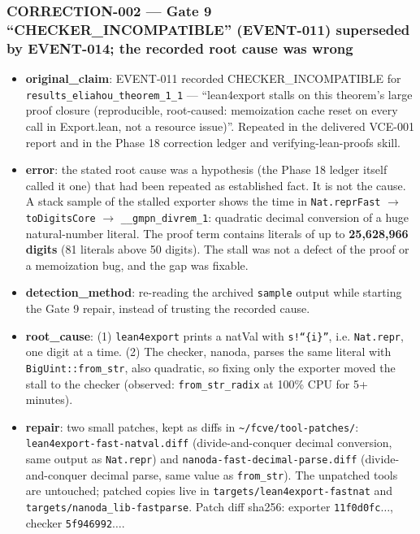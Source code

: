 \documentclass[11pt]{article}
\begin{document}
\subsubsection*{CORRECTION-002 --- Gate 9 ``CHECKER\_INCOMPATIBLE'' (EVENT-011) superseded by EVENT-014; the recorded root cause was wrong}
\begin{itemize}
\item \textbf{original\_claim}: EVENT-011 recorded CHECKER\_INCOMPATIBLE for \texttt{results\_eliahou\_theorem\_1\_1} --- ``lean4export stalls on this theorem's large proof closure (reproducible, root-caused: memoization cache reset on every call in Export.lean, not a resource issue)''. Repeated in the delivered VCE-001 report and in the Phase 18 correction ledger and verifying-lean-proofs skill.
\item \textbf{error}: the stated root cause was a hypothesis (the Phase 18 ledger itself called it one) that had been repeated as established fact. It is not the cause. A stack sample of the stalled exporter shows the time in \texttt{Nat.reprFast} \ensuremath{\to} \texttt{toDigitsCore} \ensuremath{\to} \texttt{\_\_gmpn\_divrem\_1}: quadratic decimal conversion of a huge natural-number literal. The proof term contains literals of up to \textbf{25,628,966 digits} (81 literals above 50 digits). The stall was not a defect of the proof or a memoization bug, and the gap was fixable.
\item \textbf{detection\_method}: re-reading the archived \texttt{sample} output while starting the Gate 9 repair, instead of trusting the recorded cause.
\item \textbf{root\_cause}: (1) \texttt{lean4export} prints a natVal with \texttt{s!``\{i\}''}, i.e. \texttt{Nat.repr}, one digit at a time. (2) The checker, nanoda, parses the same literal with \texttt{BigUint::from\_str}, also quadratic, so fixing only the exporter moved the stall to the checker (observed: \texttt{from\_str\_radix} at 100\% CPU for 5+ minutes).
\item \textbf{repair}: two small patches, kept as diffs in \texttt{\textasciitilde{}/fcve/tool-patches/}: \texttt{lean4export-fast-natval.diff} (divide-and-conquer decimal conversion, same output as \texttt{Nat.repr}) and \texttt{nanoda-fast-decimal-parse.diff} (divide-and-conquer decimal parse, same value as \texttt{from\_str}). The unpatched tools are untouched; patched copies live in \texttt{targets/lean4export-fastnat} and \texttt{targets/nanoda\_lib-fastparse}. Patch diff sha256: exporter \texttt{11f0d0fc\ensuremath{\ldots}}, checker \texttt{5f946992\ensuremath{\ldots}}.

\end{itemize}
\end{document}
